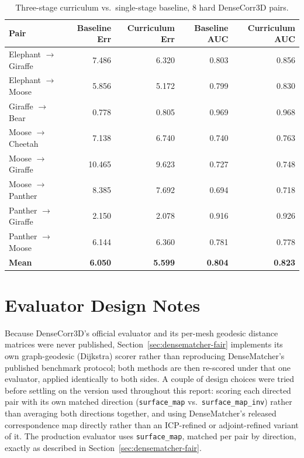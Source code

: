 \documentclass{article}
\begin{document}
\begin{table}[H]
\centering
\small
\begin{tabular}{lrrrr}
\toprule
Pair & Baseline Err & Curriculum Err & Baseline AUC & Curriculum AUC \\
\midrule
Elephant $\to$ Giraffe & 7.486 & 6.320 & 0.803 & 0.856 \\
Elephant $\to$ Moose & 5.856 & 5.172 & 0.799 & 0.830 \\
Giraffe $\to$ Bear & 0.778 & 0.805 & 0.969 & 0.968 \\
Moose $\to$ Cheetah & 7.138 & 6.740 & 0.740 & 0.763 \\
Moose $\to$ Giraffe & 10.465 & 9.623 & 0.727 & 0.748 \\
Moose $\to$ Panther & 8.385 & 7.692 & 0.694 & 0.718 \\
Panther $\to$ Giraffe & 2.150 & 2.078 & 0.916 & 0.926 \\
Panther $\to$ Moose & 6.144 & 6.360 & 0.781 & 0.778 \\
\midrule
\textbf{Mean} & \textbf{6.050} & \textbf{5.599} & \textbf{0.804} & \textbf{0.823} \\
\bottomrule
\end{tabular}
\caption{Three-stage curriculum vs.\ single-stage baseline, 8 hard DenseCorr3D pairs.}
\label{tab:curriculum-ablation}
\end{table}

\section{Evaluator Design Notes}
\label{app:evaluator-variants}

Because DenseCorr3D's official evaluator and its per-mesh geodesic distance matrices were never
published, Section~\ref{sec:densematcher-fair} implements its own graph-geodesic (Dijkstra) scorer
rather than reproducing DenseMatcher's published benchmark protocol; both methods are then re-scored
under that one evaluator, applied identically to both sides. A couple of design choices were tried
before settling on the version used throughout this report: scoring each directed pair with its own
matched direction (\texttt{surface\_map} vs.\ \texttt{surface\_map\_inv}) rather than averaging both
directions together, and using DenseMatcher's released correspondence map directly rather than an
ICP-refined or adjoint-refined variant of it. The production evaluator uses \texttt{surface\_map},
matched per pair by direction, exactly as described in Section~\ref{sec:densematcher-fair}.
\end{document}
